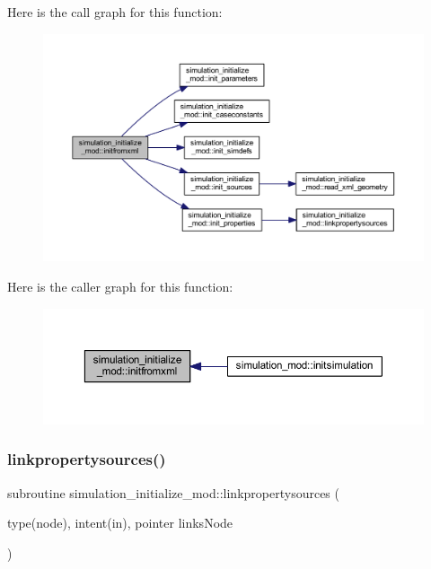 Here is the call graph for this function\+:\nopagebreak
\begin{figure}[H]
\begin{center}
\leavevmode
\includegraphics[width=350pt]{namespacesimulation__initialize__mod_aa596874d438807298121982eaa129d3a_cgraph}
\end{center}
\end{figure}
Here is the caller graph for this function\+:\nopagebreak
\begin{figure}[H]
\begin{center}
\leavevmode
\includegraphics[width=350pt]{namespacesimulation__initialize__mod_aa596874d438807298121982eaa129d3a_icgraph}
\end{center}
\end{figure}
\mbox{\label{namespacesimulation__initialize__mod_a695ed61242e902d50bc40b83a6d11f65}} 
\subsubsection{\texorpdfstring{linkpropertysources()}{linkpropertysources()}}
{\footnotesize\ttfamily subroutine simulation\+\_\+initialize\+\_\+mod\+::linkpropertysources (\begin{DoxyParamCaption}\item[{type(node), intent(in), pointer}]{links\+Node }\end{DoxyParamCaption})\hspace{0.3cm}{\ttfamily [private]}}



